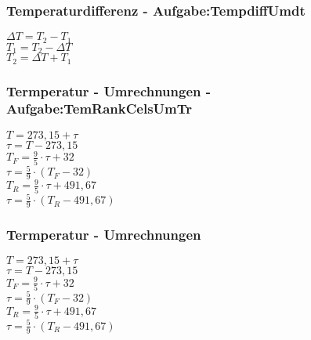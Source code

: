 \subsubsection{Temperaturdifferenz - Aufgabe:TempdiffUmdt} 
\begin{minipage}{0.45\textwidth} 
$ \Delta T = T_{2}  - T_{1} $\\ 
$ T_{1}  = T_{2}  - \Delta T $\\ 
$ T_{2}  = \Delta T + T_{1} $\\ 
\end{minipage} 
\begin{minipage}{0.45\textwidth} 
 
\end{minipage} 
\subsubsection{Termperatur - Umrechnungen - Aufgabe:TemRankCelsUmTr} 
\begin{minipage}{0.45\textwidth} 
$ T = 273,15 + \tau $\\ 
$ \tau  = T-273,15 $\\ 
$ T_{F}  = \frac{9}{5}\cdot \tau  +32 $\\ 
$ \tau  = \frac{5}{9}\cdot (T_{F}  - 32) $\\ 
$ T_{R}  = \frac{9}{5}\cdot \tau  + 491,67 $\\ 
$ \tau  = \frac{5}{9}\cdot (T_{R}  - 491,67) $\\ 
\end{minipage} 
\begin{minipage}{0.45\textwidth} 
 
\end{minipage} 
\subsubsection{Termperatur - Umrechnungen} 
\begin{minipage}{0.45\textwidth} 
$ T = 273,15 + \tau $\\ 
$ \tau  = T-273,15 $\\ 
$ T_{F}  = \frac{9}{5}\cdot \tau  +32 $\\ 
$ \tau  = \frac{5}{9}\cdot (T_{F}  - 32) $\\ 
$ T_{R}  = \frac{9}{5}\cdot \tau  + 491,67 $\\ 
$ \tau  = \frac{5}{9}\cdot (T_{R}  - 491,67) $\\ 
\end{minipage} 
\begin{minipage}{0.45\textwidth} 
 
\end{minipage} 
